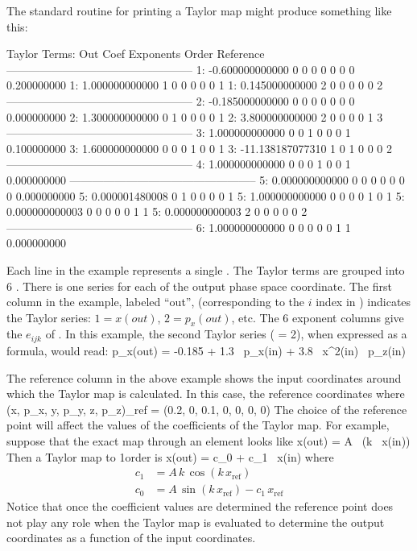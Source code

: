 The standard \bmad routine for printing a Taylor map might produce something 
like this: 
\begin{example}
   Taylor Terms:
   Out      Coef             Exponents          Order       Reference
   --------------------------------------------------
    1:     -0.600000000000   0  0  0  0  0  0       0       0.200000000
    1:      1.000000000000   1  0  0  0  0  0       1
    1:      0.145000000000   2  0  0  0  0  0       2
   --------------------------------------------------
    2:     -0.185000000000   0  0  0  0  0  0       0       0.000000000
    2:      1.300000000000   0  1  0  0  0  0       1
    2:      3.800000000000   2  0  0  0  0  1       3
   --------------------------------------------------
    3:      1.000000000000   0  0  1  0  0  0       1       0.100000000
    3:      1.600000000000   0  0  0  1  0  0       1
    3:    -11.138187077310   1  0  1  0  0  0       2
   --------------------------------------------------
    4:      1.000000000000   0  0  0  1  0  0       1       0.000000000
   --------------------------------------------------
    5:      0.000000000000   0  0  0  0  0  0       0       0.000000000
    5:      0.000001480008   0  1  0  0  0  0       1
    5:      1.000000000000   0  0  0  0  1  0       1
    5:      0.000000000003   0  0  0  0  0  1       1
    5:      0.000000000003   2  0  0  0  0  0       2
   --------------------------------------------------
    6:      1.000000000000   0  0  0  0  0  1       1       0.000000000
\end{example}
Each line in the example represents a single . The
Taylor terms are grouped into 6 . There is one
series for each of the output phase space coordinate. The first
column in the example, labeled ``out'', (corresponding to the $i$
index in ) indicates the Taylor series: $1 = x(out)$, $2 =
p_x(out)$, etc. The 6 exponent columns give the $e_{ijk}$ of
. In this example, the second Taylor series ( = 2),
when expressed as a formula, would read:
\Begineq
  p_x(out) = -0.185 + 1.3 \, p_x(in) + 3.8 \, x^2(in) \, p_z(in)
\Endeq

The reference column in the above example shows the input coordinates around
which the Taylor map is calculated. In this case, the reference
coordinates where 
\Begineq
  (x, p_x, y, p_y, z, p_z)_{ref} = (0.2, 0, 0.1, 0, 0, 0, 0)
\Endeq
The choice of the reference point will affect the values of the
coefficients of the Taylor map. For example, suppose that the exact
map through an element looks like
\Begineq
  x(out) = A \, \sin(k \, x(in))
\Endeq
Then a Taylor map to 1\St order is
\Begineq
  x(out) = c_0 + c_1 \, x(in)
\Endeq
where
\begin{align}
  c_1 &= A \, k \, \cos(k \, x_{\text{ref}}) \\
  c_0 &= A \, \sin(k \, x_{\text{ref}}) - c_1 \, x_{\text{ref}} \nonumber
\end{align}
Notice that once the coefficient values are determined the reference
point does not play any role when the Taylor map is evaluated to
determine the output coordinates as a function of the input
coordinates.

